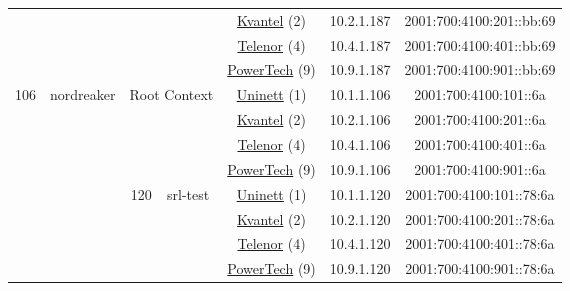 \begin{small}
\begin{center}
\begin{longtable}{|c|c|c|c|c|c|c|c|}
  &  &  &  & \multicolumn{2}{|c|}{\tiny{\href{http://kvantel.no}{Kvantel} (2)}} & \tiny{10.2.1.187} & \tiny{2001:700:4100:201::bb:69} \\* \cline{5-5}\cline{6-6}\cline{7-7}\cline{8-8}
  &  &  &  & \multicolumn{2}{|c|}{\tiny{\href{https://www.telenor.no}{Telenor} (4)}} & \tiny{10.4.1.187} & \tiny{2001:700:4100:401::bb:69} \\* \cline{5-5}\cline{6-6}\cline{7-7}\cline{8-8}
  &  &  &  & \multicolumn{2}{|c|}{\tiny{\href{http://www.powertech.no}{PowerTech} (9)}} & \tiny{10.9.1.187} & \tiny{2001:700:4100:901::bb:69} \\ \hline
 \multirow{32}{*}{\tiny{106}} & \multicolumn{1}{|l|}{\multirow{32}{*}{\tiny{nordreaker}}} & \multicolumn{2}{|c|}{\multirow{4}{*}{\tiny{Root Context}}} & \multicolumn{2}{|c|}{\tiny{\href{https://www.uninett.no}{Uninett} (1)}} & \tiny{10.1.1.106} & \tiny{2001:700:4100:101::6a} \\* \cline{5-5}\cline{6-6}\cline{7-7}\cline{8-8}
  &  & \multicolumn{2}{|c|}{} & \multicolumn{2}{|c|}{\tiny{\href{http://kvantel.no}{Kvantel} (2)}} & \tiny{10.2.1.106} & \tiny{2001:700:4100:201::6a} \\* \cline{5-5}\cline{6-6}\cline{7-7}\cline{8-8}
  &  & \multicolumn{2}{|c|}{} & \multicolumn{2}{|c|}{\tiny{\href{https://www.telenor.no}{Telenor} (4)}} & \tiny{10.4.1.106} & \tiny{2001:700:4100:401::6a} \\* \cline{5-5}\cline{6-6}\cline{7-7}\cline{8-8}
  &  & \multicolumn{2}{|c|}{} & \multicolumn{2}{|c|}{\tiny{\href{http://www.powertech.no}{PowerTech} (9)}} & \tiny{10.9.1.106} & \tiny{2001:700:4100:901::6a} \\* \cline{3-3}\cline{4-4}\cline{5-5}\cline{6-6}\cline{7-7}\cline{8-8}
  &  & \multirow{4}{*}{\tiny{120}} & \multicolumn{1}{|l|}{\multirow{4}{*}{\tiny{srl-test}}} & \multicolumn{2}{|c|}{\tiny{\href{https://www.uninett.no}{Uninett} (1)}} & \tiny{10.1.1.120} & \tiny{2001:700:4100:101::78:6a} \\* \cline{5-5}\cline{6-6}\cline{7-7}\cline{8-8}
  &  &  &  & \multicolumn{2}{|c|}{\tiny{\href{http://kvantel.no}{Kvantel} (2)}} & \tiny{10.2.1.120} & \tiny{2001:700:4100:201::78:6a} \\* \cline{5-5}\cline{6-6}\cline{7-7}\cline{8-8}
  &  &  &  & \multicolumn{2}{|c|}{\tiny{\href{https://www.telenor.no}{Telenor} (4)}} & \tiny{10.4.1.120} & \tiny{2001:700:4100:401::78:6a} \\* \cline{5-5}\cline{6-6}\cline{7-7}\cline{8-8}
  &  &  &  & \multicolumn{2}{|c|}{\tiny{\href{http://www.powertech.no}{PowerTech} (9)}} & \tiny{10.9.1.120} & \tiny{2001:700:4100:901::78:6a} \\* \cline{3-3}\cline{4-4}\cline{5-5}\cline{6-6}\cline{7-7}\cline{8-8}

\end{longtable}
\end{center}
\end{small}
